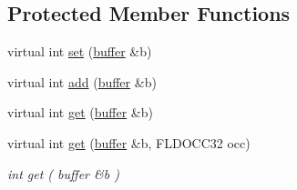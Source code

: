 \subsection*{Protected Member Functions}
\begin{DoxyCompactItemize}
\item 
virtual int \hyperlink{classatmi_1_1_tfield_3_01char_01_5_01_4_af7be84fbdff0665d9c94b83872b299b7}{set} (\hyperlink{classatmi_1_1buffer}{buffer} \&b)
\item 
virtual int \hyperlink{classatmi_1_1_tfield_3_01char_01_5_01_4_ae3036c038b361aee2fc357c1c7d1304a}{add} (\hyperlink{classatmi_1_1buffer}{buffer} \&b)
\item 
virtual int \hyperlink{classatmi_1_1_tfield_3_01char_01_5_01_4_a5df77c9bee99916f6d14f5beeec54dac}{get} (\hyperlink{classatmi_1_1buffer}{buffer} \&b)
\item 
virtual int \hyperlink{classatmi_1_1_tfield_3_01char_01_5_01_4_afaedd7d5902233652bed642bdceb9db1}{get} (\hyperlink{classatmi_1_1buffer}{buffer} \&b, F\+L\+D\+O\+C\+C32 occ)
\begin{DoxyCompactList}\small\item\em int get ( buffer \&b ) \end{DoxyCompactList}\end{DoxyCompactItemize}
